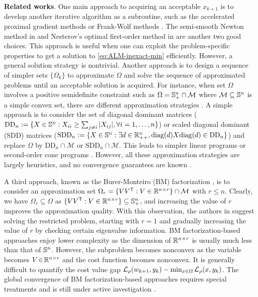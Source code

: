 \documentclass[11pt]{article}
\begin{document}
 
\vspace{3pt}
\noindent \textbf{Related works}.  One main approach to acquiring an acceptable $x_{k+1}$ is to develop another iterative algorithm as a subroutine, such as the accelerated proximal gradient methods \cite{beck2009fast} or Frank-Wolf methods \cite{frank1956algorithm}. The semi-smooth Newton method in \cite{yang2015sdpnal+,zhao2010newton} and Nesterov's optimal first-order method in \cite{lan2016iteration} are another two good choices. 
This approach is useful when one can exploit the problem-specific properties to get a solution to  \eqref{eq:ALM-inexact-min} efficiently. However, a general solution strategy is nontrivial. 
Another approach is to design a sequence of simpler sets $\{\Omega_{k}\} $ to approximate $\Omega$ and solve the sequence of approximated problems until an acceptable solution is acquired. For instance, when set $\Omega$ involves a positive semidefinite constraint such as $\Omega = \mathbb{S}^n_+ \cap \mathcal{M}$ where $\mathcal{M} \subseteq \mathbb{S}^n$ is a simple convex set, there are different approximation strategies \cite{ahmadi2017sum,zheng2022block,liao2022iterative}. A simple approach is to consider the set of diagonal dominant  matrices ($\mathrm{DD}_n :=\{X \in \mathbb{S}^n : X_{ii} \geq \sum_{j \neq i} |X_{ij}|, \forall i = 1,\ldots,n\}$) or 
scaled diagonal dominant (SDD) matrices ($\mathrm{SDD}_n:=\{X \in \mathbb{S}^n : \exists d \in \mathbb{R}^n_{++}, \mathrm{diag}(d)X\mathrm{diag}(d) \in \mathrm{DD}_n \}$) and replace $\Omega$ by $\mathrm{DD}_n \cap \mathcal{M}$ or $\mathrm{SDD}_n \cap \mathcal{M}$. 
This leads to simpler linear programs or second-order cone programs \cite{ahmadi2017sum}. However, all these approximation strategies are largely heuristics, and no convergence guarantees are known \cite{zheng2021chordal}. 

A third approach, known as the Burer-Monteiro (BM) factorization \cite{burer2003nonlinear}, is to consider an approximation set $\Omega_r = \{V V^{\mathsf{ T}}: V \in \mathbb{R}^{n \times r} \} \cap \mathcal{M}$ with $r \leq n$. Clearly, we have $\Omega_r \subseteq \Omega$ as $\{V V^{\mathsf{ T}}: V \in \mathbb{R}^{n \times r} \} \subseteq \mathbb{S}^n_+$, and increasing the value of $r$ improves the approximation quality. With this observation, the authors in \cite{monteiro2024low} suggest solving the restricted problem, starting with $r = 1$ and gradually increasing the value of $r$ by checking certain eigenvalue information. BM factorization-based approaches enjoy lower complexity as the dimension of $\mathbb{R}^{n \times r}$ is usually much less than that of $\mathbb{S}^n$. However, the subproblem becomes nonconvex as the variable becomes  $V \!\in\! \mathbb{R}^{n \times r}$ and the cost function becomes nonconvex.  It is generally difficult to quantify the cost value gap $\mathcal{L}_\rho(w_{k+1},y_k) - \min_{x\in \Omega}\mathcal{L}_{\rho}(x,y_k)$. The global convergence of BM factorization-based approaches requires special treatments and is still under active investigation \cite{tang2024feasible,wang2023decomposition}.
\end{document}
